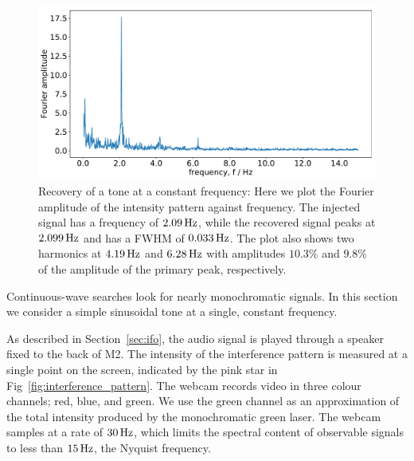 \documentclass[paper-main.tex]{subfiles}
\begin{document}
\begin{figure}
	\includegraphics[width=.49\textwidth]{figures/webcam_expt_4_0209-cropped.pdf}
	\caption{\label{fig:webcam_spectrum}
Recovery of a tone at a constant frequency: Here we plot the Fourier amplitude of the intensity pattern against frequency.
The injected signal has a frequency of $2.09\,{\rm Hz}$, while the recovered signal peaks at $2.099\,{\rm Hz}$ and has a FWHM of $0.033\,{\rm Hz}$.
The plot also shows two harmonics at $4.19\,{\rm Hz}$ and $6.28\,{\rm Hz}$ with amplitudes $10.3 \%$ and $9.8 \%$ of the amplitude of the primary peak, respectively.
}	
\end{figure}


Continuous-wave searches look for nearly monochromatic signals. In this section we consider a simple sinusoidal tone at a single, constant frequency. %

As described in Section~\ref{sec:ifo}, the audio signal is played through a speaker fixed to the back of M2. 
The intensity of the interference pattern is measured at a single point on the screen, indicated by the pink star in Fig~\ref{fig:interference_pattern}. 
The webcam records video in three colour channels; red, blue, and green. 
We use the green channel as an approximation of the total intensity produced by the monochromatic green laser.
The webcam samples at a rate of $30\, {\rm Hz}$, which limits the spectral content of observable signals to less than $15\,{\rm Hz}$, the Nyquist frequency. 


\end{document}
